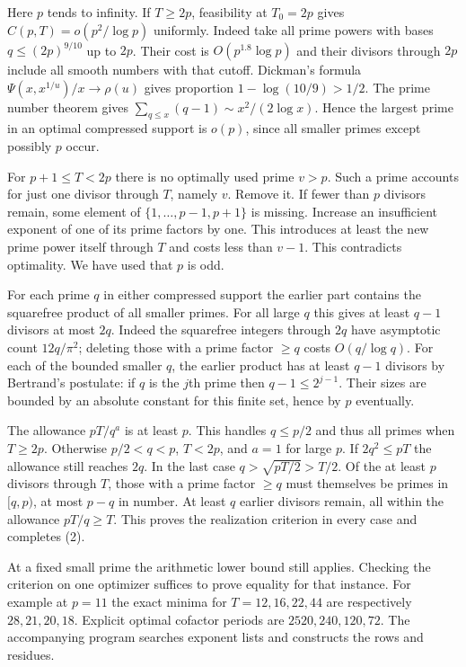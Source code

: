 \documentclass[11pt]{article}
\newcommand{\head}[1]{\par\vspace{5pt}{\large\bfseries #1}\par}
\begin{document}
\newpage
\head{2. Realizing an optimizer uniformly in the cap}
Here $p$ tends to infinity. If $T\ge2p$, feasibility at $T_0=2p$ gives $C(p,T)=o(p^2/\log p)$ uniformly. Indeed take all prime powers with bases $q\le (2p)^{9/10}$ up to $2p$. Their cost is $O(p^{1.8}\log p)$ and their divisors through $2p$ include all smooth numbers with that cutoff. Dickman's formula $\Psi(x,x^{1/u})/x\to\rho(u)$ gives proportion $1-\log(10/9)>1/2$. The prime number theorem gives $\sum_{q\le x}(q-1)\sim x^2/(2\log x)$. Hence the largest prime in an optimal compressed support is $o(p)$, since all smaller primes except possibly $p$ occur. 

For $p+1\le T<2p$ there is no optimally used prime $v>p$. Such a prime accounts for just one divisor through $T$, namely $v$. Remove it. If fewer than $p$ divisors remain, some element of $\{1,\ldots,p-1,p+1\}$ is missing. Increase an insufficient exponent of one of its prime factors by one. This introduces at least the new prime power itself through $T$ and costs less than $v-1$. This contradicts optimality. We have used that $p$ is odd.

For each prime $q$ in either compressed support the earlier part contains the squarefree product of all smaller primes. For all large $q$ this gives at least $q-1$ divisors at most $2q$. Indeed the squarefree integers through $2q$ have asymptotic count $12q/\pi^2$; deleting those with a prime factor $\ge q$ costs $O(q/\log q)$. For each of the bounded smaller $q$, the earlier product has at least $q-1$ divisors by Bertrand's postulate: if $q$ is the $j$th prime then $q-1\le2^{j-1}$. Their sizes are bounded by an absolute constant for this finite set, hence by $p$ eventually.

The allowance $pT/q^a$ is at least $p$. This handles $q\le p/2$ and thus all primes when $T\ge2p$. Otherwise $p/2<q<p$, $T<2p$, and $a=1$ for large $p$. If $2q^2\le pT$ the allowance still reaches $2q$. In the last case $q>\sqrt{pT/2}>T/2$. Of the at least $p$ divisors through $T$, those with a prime factor $\ge q$ must themselves be primes in $[q,p)$, at most $p-q$ in number. At least $q$ earlier divisors remain, all within the allowance $pT/q\ge T$. This proves the realization criterion in every case and completes (2).

At a fixed small prime the arithmetic lower bound still applies. Checking the criterion on one optimizer suffices to prove equality for that instance. For example at $p=11$ the exact minima for $T=12,16,22,44$ are respectively $28,21,20,18$. Explicit optimal cofactor periods are $2520,240,120,72$. The accompanying program searches exponent lists and constructs the rows and residues.
\end{document}
